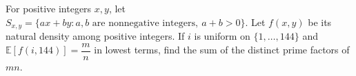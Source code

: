 For positive integers $x,y$, let $S_{x,y}=\{ax+by:a,b\text{ are nonnegative integers},\ a+b>0\}$. Let $f(x,y)$ be its natural density among positive integers. If $i$ is uniform on $\{1,\ldots,144\}$ and $\mathbb E[f(i,144)]=\dfrac{m}{n}$ in lowest terms, find the sum of the distinct prime factors of $mn$.
